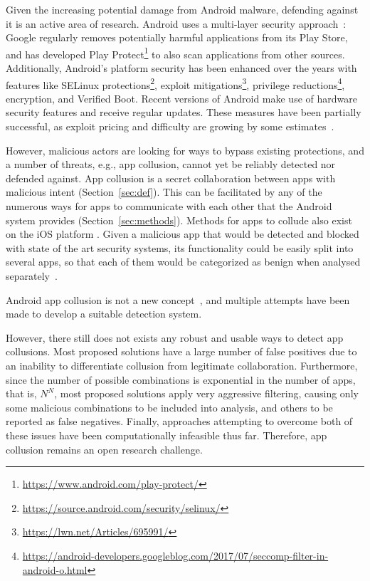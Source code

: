 \documentclass[article, oneside]{aaltoseries}
\newcommand{\TODO}[1]{\todo[inline]{#1}}
\newcommand{\Sref}[1]{Section~\ref{#1}}
\begin{document}
Given the increasing potential damage from Android malware, defending against it is an active area of research. Android uses a multi-layer security approach~\cite{AOSP2018}: Google regularly removes potentially harmful applications from its Play Store, and has developed Play Protect\footnote{\url{https://www.android.com/play-protect/}} to also scan applications from other sources. Additionally, Android's platform security has been enhanced over the years with features like SELinux protections\footnote{\url{https://source.android.com/security/selinux/}}, exploit mitigations\footnote{\url{https://lwn.net/Articles/695991/}}, privilege reductions\footnote{\url{https://android-developers.googleblog.com/2017/07/seccomp-filter-in-android-o.html}}, encryption, and Verified Boot. Recent versions of Android make use of hardware security features and receive regular updates. These measures have been partially successful, as exploit pricing and difficulty are growing by some estimates~\cite{AOSP2018}.

However, malicious actors are looking for ways to bypass existing protections, and a number of threats, e.g., app collusion, cannot yet be reliably detected nor defended against. App collusion is a secret collaboration between apps with malicious intent  (\Sref{sec:def}). This can be facilitated by any of the numerous ways for apps to communicate with each other that the Android system provides (\Sref{sec:methods}). Methods for apps to collude also exist on the iOS platform \cite{Deshotels2016}. Given a malicious app that would be detected and blocked with state of the art security systems, its functionality could be easily split into several apps, so that each of them would be categorized as benign when analysed separately~\cite{Chen2018}.

Android app collusion is not a new concept~\cite{Schlegel2011}, and multiple attempts have been made to develop a suitable detection system. \TODO{brief overview of existing approaches based on \Sref{sec:approaches}}

However, there still does not exists any robust and usable ways to detect app collusions. Most proposed solutions have a large number of false positives due to an inability to differentiate collusion from legitimate collaboration. Furthermore, since the number of possible combinations is exponential in the number of apps, that is, $N^N$, most proposed solutions apply very aggressive filtering, causing only some malicious combinations to be included into analysis, and others to be reported as false negatives. Finally, approaches attempting to overcome both of these issues have been computationally infeasible thus far. Therefore, app collusion remains an open research challenge.
\end{document}
